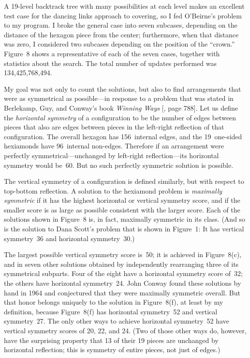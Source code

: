 A 19-level backtrack tree with many possibilities at each level makes
an excellent test case for the dancing links approach to covering, so
I fed O'Beirne's problem to my program.  I broke the general case into
seven subcases, depending on the distance of the hexagon piece from
the center; furthermore, when that distance was zero, I considered two
subcases depending on the position of the ``crown.''  Figure~8 shows a
representative of each of the seven cases, together with statistics
about the search.  The total number of updates performed was
134{,}425{,}768{,}494.

My goal was not only to count the solutions, but also to find
arrangements that were as symmetrical as possible---in response to a
problem that was stated in Berlekamp, Guy, and Conway's book {\sl
Winning Ways\/} [\BGC, page 788].  Let us define the {\it horizontal
sym\-metry\/} of a configuration to be the number of edges between pieces
that also are edges between pieces in the left-right reflection
of that configuration.  The overall hexagon has 156~internal edges,
and the 19~one-sided hexiamonds have 96~internal non-edges.  Therefore
if an arrangement were perfectly symmetrical---unchanged by left-right
reflection---its horizontal symmetry would be~60.  But no such
perfectly symmetric solution is possible.

The vertical symmetry of a
configuration is defined similarly, but with respect to top-bottom
reflection.  A solution to the hexiamond problem is {\it maximally
symmetric\/} if it has the highest horizontal or vertical symmetry
score, and if the smaller score is as large as possible consistent
with the larger score.  Each of the solutions shown in Figure~8 is, in
fact, maximally symmetric in its class.  (And so is the solution to
Dana Scott's problem that is shown in Figure~1: It has vertical
symmetry~36 and horizontal symmetry~30.)

The largest possible vertical symmetry score is~50; it is achieved in
Figure~8(c), and in seven other solutions obtained by independently
rearranging three of its symmetrical subparts.  Four of the eight have
a horizontal symmetry score of~32; the others have horizontal
symmetry~24. John Conway found these solutions by hand in 1964 and
conjectured that they were maximally symmetric overall.  But that
honor belongs uniquely to the solution in Figure~8(f), at least by my
definition, because Figure~8(f) has horizontal symmetry~52 and
vertical symmetry~27.  The only other ways to achieve horizontal
symmetry~52 have vertical symmetry scores of 20, 22, and 24. (Two of
those other ways do, however, have the surprising property that 13 of
their 19 pieces are unchanged by horizontal reflection; this is
symmetry of entire pieces, not just of edges.)

